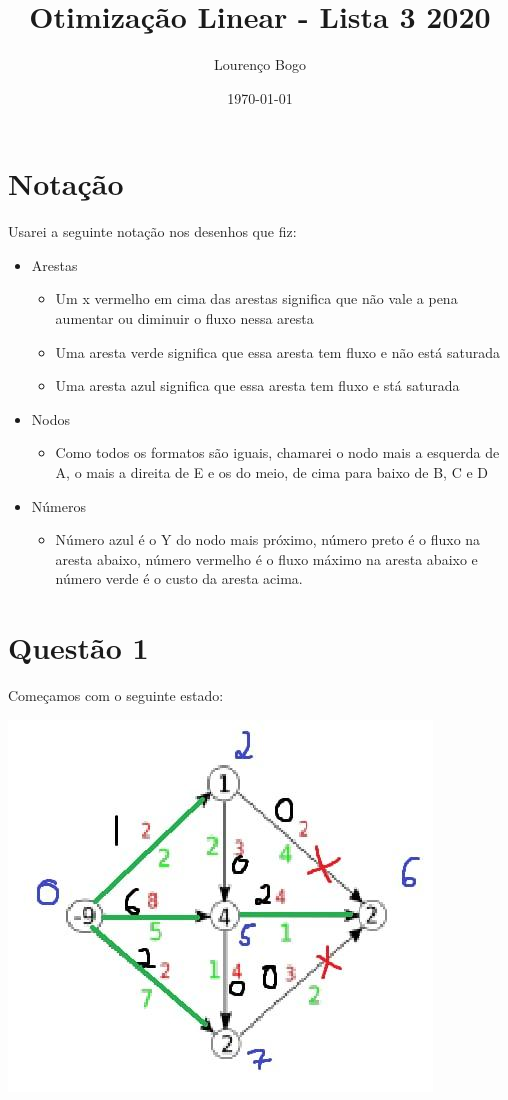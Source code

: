\documentclass[11pt]{article}
\author{Lourenço Bogo}
\date{\today}
\title{Otimização Linear - Lista 3 2020}
\begin{document}
\maketitle
\tableofcontents


\section{Notação}
\label{sec:org05f5457}
Usarei a seguinte notação nos desenhos que fiz:
\begin{itemize}
\item Arestas
\begin{itemize}
\item Um x vermelho em cima das arestas significa que não vale a pena aumentar ou diminuir o fluxo nessa aresta
\item Uma aresta verde significa que essa aresta tem fluxo e não está saturada
\item Uma aresta azul significa que essa aresta tem fluxo e stá saturada
\end{itemize}
\item Nodos
\begin{itemize}
\item Como todos os formatos são iguais, chamarei o nodo mais a esquerda de A, o mais a direita de E e os do meio, de cima para baixo de B, C e D
\end{itemize}
\item Números
\begin{itemize}
\item Número azul é o Y do nodo mais próximo, número preto é o fluxo na aresta abaixo, número vermelho é o fluxo máximo na aresta abaixo e número verde é o custo da aresta acima.
\end{itemize}
\end{itemize}

\newpage
\section{Questão 1}
\label{sec:org690967a}
Começamos com o seguinte estado:
\begin{center}
\includegraphics[width=.9\linewidth]{11.jpg}
\end{center}
\end{document}
